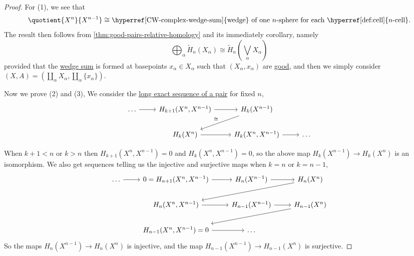 \begin{proof}
	For (1), we see that
	\[
		\quotient{X^n}{X^{n-1}} \cong \text{\hyperref[CW-complex-wedge-sum]{wedge} of one \(n\)-sphere for each \hyperref[def:cell]{\(n\)-cell}}.
	\]
	The result then follows from \autoref{thm:good-pairs-relative-homology} and its immediately corollary, namely
	\[
		\bigoplus_\alpha \widetilde{H} _n(X_\alpha )\cong \widetilde{H} _n\left(\bigvee_\alpha X_\alpha \right)
	\]
	provided that the \hyperref[CW-complex-wedge-sum]{wedge sum} is formed at basepoints \(x_\alpha \in X_\alpha \) such that \((X_\alpha , x_\alpha )\)
	are \hyperref[def:good-pair]{good}, and then we simply consider \((X, A) = (\coprod_{\alpha } X_\alpha , \coprod_{\alpha } \{x_\alpha\})\).

	Now we prove (2) and (3), We consider the \hyperref[thm:long-exact-sequence-of-a-pair]{long exact sequence of a pair} for fixed \(n\),
	\[
		\begin{tikzcd}
			\dots & {H_{k+1}(X^n, X^{n-1})} & {H_k(X^{n-1})} \\
			& {H_k(X^n)} & {H_k(X^n, X^{n-1})} & \dots
			\arrow[from=1-1, to=1-2]
			\arrow[from=1-2, to=1-3]
			\arrow["\cong"', from=1-3, to=2-2]
			\arrow[from=2-2, to=2-3]
			\arrow[from=2-3, to=2-4]
		\end{tikzcd}
	\]

	When \(k + 1 < n\) or \(k > n\) then \(H_{k + 1}(X^n, X^{n - 1}) = 0\) and \(H_k(X^n, X^{n - 1}) = 0\), so the above map \(H_k(X^{n - 1}) \to H_k(X^n)\)
	is an isomorphism. We also get sequences telling us the injective and surjective maps when \(k = n\) or \(k = n - 1\),
	\[
		\begin{tikzcd}
			\dots & {0=H_{n+1}(X^n, X^{n-1})} & {H_n(X^{n-1})} & {H_n(X^n)} \\
			& {H_{n}(X^n, X^{n-1})} & {H_{n-1}(X^{n-1})} & {H_{n-1}(X^n)} \\
			& {H_{n-1}(X^n, X^{n-1})=0} & \dots
			\arrow[from=1-1, to=1-2]
			\arrow[from=1-2, to=1-3]
			\arrow[from=1-3, to=1-4]
			\arrow[from=1-4, to=2-2]
			\arrow[from=2-2, to=2-3]
			\arrow[from=2-3, to=2-4]
			\arrow[from=2-4, to=3-2]
			\arrow[from=3-2, to=3-3]
		\end{tikzcd}
	\]
	So the maps \(H_n(X^{n - 1}) \to H_n(X^n)\) is injective, and the map \(H_{n - 1}(X^{n - 1}) \to H_{n - 1}(X^n)\) is surjective.


\end{proof}
